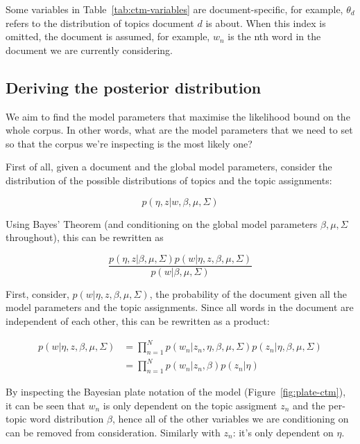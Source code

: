 \documentclass[12pt,a4paper,twoside,openright]{report}
\begin{document}
Some variables in Table~\ref{tab:ctm-variables} are document-specific, for example, $\theta_d$ refers to the distribution of topics document $d$ is about. When this index is omitted, the document is assumed, for example, $w_n$ is the nth word in the document we are currently considering.

\subsection{Deriving the posterior distribution}

We aim to find the model parameters that maximise the likelihood bound on the whole corpus. In other words, what are the model parameters that we need to set so that the corpus we're inspecting is the most likely one?

First of all, given a document and the global model parameters, consider the distribution of the possible distributions of topics and the topic assignments:

\begin{equation}
p(\eta, z | w, \beta, \mu, \Sigma)
\end{equation}

Using Bayes' Theorem (and conditioning on the global model parameters $\beta, \mu, \Sigma$ throughout), this can be rewritten as 

\begin{equation}
\frac{p(\eta, z | \beta, \mu, \Sigma) p(w | \eta, z, \beta, \mu, \Sigma)}{p(w | \beta, \mu, \Sigma)}
\end{equation}

First, consider, $p(w | \eta, z, \beta, \mu, \Sigma)$, the probability of the document given all the model parameters and the topic assignments. Since all words in the document are independent of each other, this can be rewritten as a product:

\begin{align}
p(w | \eta, z, \beta, \mu, \Sigma) &= \prod\limits_{n=1}^N p(w_n | z_n, \eta, \beta, \mu, \Sigma) p(z_n | \eta, \beta, \mu, \Sigma)\\
& = \prod\limits_{n=1}^N p(w_n | z_n, \beta) p(z_n | \eta)
\end{align}

By inspecting the Bayesian plate notation of the model (Figure~\ref{fig:plate-ctm}), it can be seen that $w_n$ is only dependent on the topic assigment $z_n$ and the per-topic word distribution $\beta$, hence all of the other variables we are conditioning on can be removed from consideration. Similarly with $z_n$: it's only dependent on $\eta$.
\end{document}
